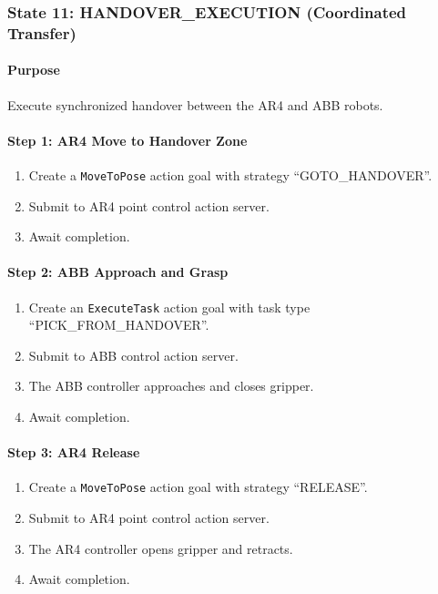 \subsubsection{State 11: HANDOVER\_EXECUTION (Coordinated Transfer)}
\label{state:handoverexecution}

\paragraph{Purpose}

Execute synchronized handover between the AR4 and ABB robots.

\paragraph{Step 1: AR4 Move to Handover Zone}

\begin{enumerate}
    \item Create a \texttt{MoveToPose} action goal with strategy ``GOTO\_HANDOVER''.
    \item Submit to AR4 point control action server.
    \item Await completion.
\end{enumerate}

\paragraph{Step 2: ABB Approach and Grasp}

\begin{enumerate}
    \item Create an \texttt{ExecuteTask} action goal with task type ``PICK\_FROM\_HANDOVER''.
    \item Submit to ABB control action server.
    \item The ABB controller approaches and closes gripper.
    \item Await completion.
\end{enumerate}

\paragraph{Step 3: AR4 Release}

\begin{enumerate}
    \item Create a \texttt{MoveToPose} action goal with strategy ``RELEASE''.
    \item Submit to AR4 point control action server.
    \item The AR4 controller opens gripper and retracts.
    \item Await completion.
\end{enumerate}

